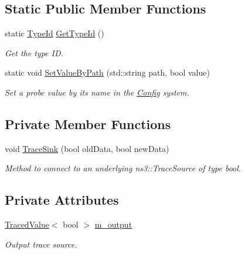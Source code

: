\subsection*{Static Public Member Functions}
\begin{DoxyCompactItemize}
\item 
static \hyperlink{classns3_1_1TypeId}{Type\+Id} \hyperlink{classns3_1_1BooleanProbe_a67fd754e1b8332a97b19c25b70b331b7}{Get\+Type\+Id} ()
\begin{DoxyCompactList}\small\item\em Get the type ID. \end{DoxyCompactList}\item 
static void \hyperlink{classns3_1_1BooleanProbe_a01f1f1134881019be5e61517c697bf93}{Set\+Value\+By\+Path} (std\+::string path, bool value)
\begin{DoxyCompactList}\small\item\em Set a probe value by its name in the \hyperlink{namespacens3_1_1Config}{Config} system. \end{DoxyCompactList}\end{DoxyCompactItemize}
\subsection*{Private Member Functions}
\begin{DoxyCompactItemize}
\item 
void \hyperlink{classns3_1_1BooleanProbe_a6b8ae4c655dfaff4e6a7de20680fa3a0}{Trace\+Sink} (bool old\+Data, bool new\+Data)
\begin{DoxyCompactList}\small\item\em Method to connect to an underlying ns3\+::\+Trace\+Source of type bool. \end{DoxyCompactList}\end{DoxyCompactItemize}
\subsection*{Private Attributes}
\begin{DoxyCompactItemize}
\item 
\hyperlink{classns3_1_1TracedValue}{Traced\+Value}$<$ bool $>$ \hyperlink{classns3_1_1BooleanProbe_a19ccb2d24152ccb48e310f084da2a590}{m\+\_\+output}
\begin{DoxyCompactList}\small\item\em Output trace source. \end{DoxyCompactList}\end{DoxyCompactItemize}
